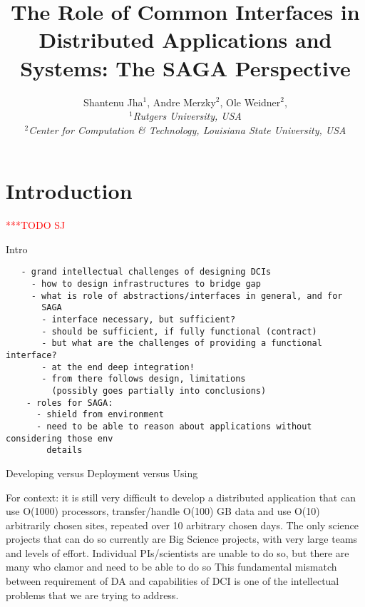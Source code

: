 \documentclass[a4paper,10pt]{article}
\newcommand{\todo}[1]{     {\textcolor{red}  { ***TODO      #1 }}}
\newcommand{\todo}[1]{}
\begin{document}
 \title{ \large \vspace{-3.5em} The Role of Common Interfaces in
   Distributed Applications and Systems: The SAGA Perspective}


 \author{\normalsize Shantenu Jha$^{1}$, Andre Merzky$^{2}$, Ole Weidner$^{2}$, \\
   \small{\emph{$^{1}$Rutgers University, USA}}\\
   \small{\emph{$^{2}$Center for Computation \& Technology, Louisiana State University, USA}}\\
 }
 \date{}
 \maketitle

 
\section{Introduction}
 \todo{SJ}
 \label{intro}

  Intro

 \begin{verbatim}
   - grand intellectual challenges of designing DCIs
     - how to design infrastructures to bridge gap
     - what is role of abstractions/interfaces in general, and for
       SAGA
       - interface necessary, but sufficient?
       - should be sufficient, if fully functional (contract)
       - but what are the challenges of providing a functional interface?
       - at the end deep integration!
       - from there follows design, limitations
         (possibly goes partially into conclusions)
    - roles for SAGA: 
      - shield from environment
      - need to be able to reason about applications without considering those env
        details
 \end{verbatim}

Developing versus Deployment versus Using

For context: it is still very difficult to develop a distributed
application that can use O(1000) processors, transfer/handle O(100) GB
data and use O(10) arbitrarily chosen sites, repeated over 10
arbitrary chosen days. The only science projects that can do so
currently are Big Science projects, with very large teams and levels
of effort.  Individual PIs/scientists are unable to do so, but there
are many who clamor and need to be able to do so This fundamental
mismatch between requirement of DA and capabilities of DCI is one of
the intellectual problems that we are trying to address.
\end{document}
